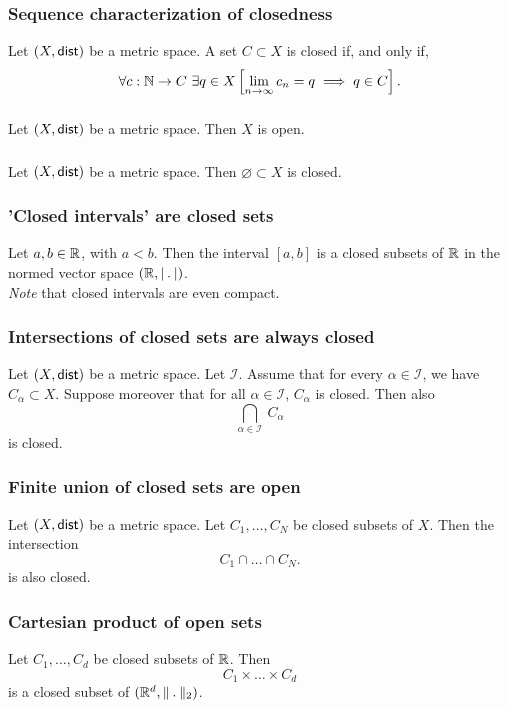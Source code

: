 \subsubsection*{Sequence characterization of closedness}
\uprop Let $(X, \mathsf{dist})$ be a metric space. A set $C \subset X$ is closed if,
and only if,
\[
    \forall c : \mathbb{N} \to C\ \exists q \in X \left[ \lim_{n \to \infty} c_n = q \implies q \in C \right].
\]

\subsubsection*{}
\uprop Let $(X, \mathsf{dist})$ be a metric space. Then $X$ is open.

\subsubsection*{}
\uprop Let $(X, \mathsf{dist})$ be a metric space. Then $\varnothing \subset X$ is closed.

\subsubsection*{'Closed intervals' are closed sets}
\uprop Let $a, b \in \mathbb{R}$, with $a < b$. Then the interval $[a,b]$ is a closed
subsets of $\mathbb{R}$ in the normed vector space $(\R, \normR)$.\\
\emph{Note} that closed intervals are even compact.

\subsubsection*{Intersections of closed sets are always closed}
\uthm Let $(X, \mathsf{dist})$ be a metric space. Let $\mathcal{I}$.
Assume that for every $\alpha \in \mathcal{I}$, we have $C_\alpha \subset X$.
Suppose moreover that for all $\alpha \in \mathcal{I}$, $C_\alpha$ is closed.
Then also
\[
    \bigcap_{\alpha \in \mathcal{I}}\ C_\alpha
\]
is closed.

\subsubsection*{Finite union of closed sets are open}
\uprop Let $(X, \mathsf{dist})$ be a metric space. Let $C_1, \dots, C_N$ be closed
subsets of $X$. Then the intersection
\[
    C_1 \cap \dots \cap C_N.
\]
is also closed.

\subsubsection*{Cartesian product of open sets}
\uprop Let $C_1, \dots, C_d$ be closed subsets of $\mathbb{R}$. Then
\[
    C_1 \times \dots \times C_d
\]
is a closed subset of $(\R^d, \norm_2)$.

